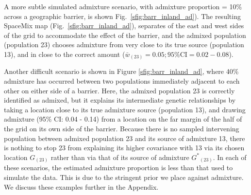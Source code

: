 \documentclass[12pt]{article}
\newcommand{\identifyadmixsource}[1]{{#1^{*}}}
\begin{document}
A more subtle simulated admixture scenario, with admixture proportion = 10\% across a geographic barrier, 
is shown Fig.\ \ref{sfig:barr_inland_ad}).  
The resulting SpaceMix map (Fig.\ \ref{sfig:barr_inland_ad}), 
separates of the east and west sides of the grid to accommodate the effect of the barrier,
and the admixed population (population 23) chooses admixture from very close to its true source (population 13), 
and in close to the correct amount ($\bar{w}_{(23)} = 0.05; 95\% \text{CI} = 0.02-0.08$).

Another difficult scenario is shown in Figure \ref{sfig:barr_inland_ad},
where 40\% admixture has occurred between two populations immediately adjacent to each other on either side of a barrier.  
Here, the admixed population 23 is correctly identified as admixed, 
but it explains its intermediate genetic relationships by taking a location close to its true admixture source (population 13), 
and drawing admixture (95\% CI: 0.04 - 0.14) from a location on the far margin of the half of the grid on its own side of the barrier.
Because there is no sampled intervening population between admixed population 23 and its source of admixture 13, there is nothing to stop 23 from explaining its higher covariance with 13 via its chosen location $G_{(23)}$ rather than via that of its source of admixture $\identifyadmixsource{G}_{(23)}$.  
In each of these scenarios, the estimated admixture proportion is less than that used to simulate the data.  This is due to the stringent prior we place against admixture.  We discuss these examples further in the Appendix.
\end{document}
